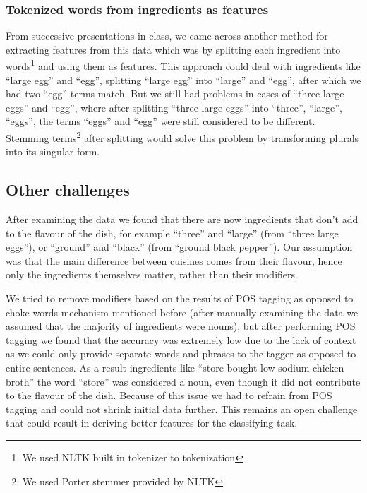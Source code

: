 \documentclass[prodmode,acmtap]{acmlarge}
\begin{document}
\subsubsection{Tokenized words from ingredients as features}
From successive presentations in class, we came across another method for extracting features from this data which was by splitting each ingredient into words\footnote{We used NLTK built in tokenizer to tokenization} and using them as features. This approach could deal with ingredients like ``large egg'' and ``egg'', splitting ``large egg'' into ``large'' and ``egg'', after which we had two ``egg'' terms match. 
But we still had problems in cases of ``three large eggs'' and ``egg'', where after splitting ``three large eggs'' into ``three'', ``large'', ``eggs'', the terms ``eggs'' and ``egg'' were still considered to be different. Stemming terms\footnote{We used Porter stemmer provided by NLTK} after splitting would solve this problem by transforming plurals into its singular form.

\subsection{Other challenges}
After examining the data we found that there are now ingredients that don’t add to the flavour of the dish, for example ``three'' and ``large'' (from ``three large eggs''), or ``ground'' and ``black'' (from ``ground black pepper''). Our assumption was that the main difference between cuisines comes from their flavour, hence only the ingredients themselves matter, rather than their modifiers. 

We tried to remove modifiers based on the results of POS tagging as opposed to choke words mechanism mentioned before (after manually examining the data we assumed that the majority of ingredients were nouns), but after performing POS tagging we found that the accuracy was extremely low due to the lack of context as we could only provide separate words and phrases to the tagger as opposed to entire sentences. As a result ingredients like ``store bought low sodium chicken broth'' the word ``store'' was considered a noun, even though it did not contribute to the flavour of the dish. Because of this issue we had to refrain from POS tagging and could not shrink initial data further. This remains an open challenge that could result in deriving better features for the classifying task.


\end{document}
